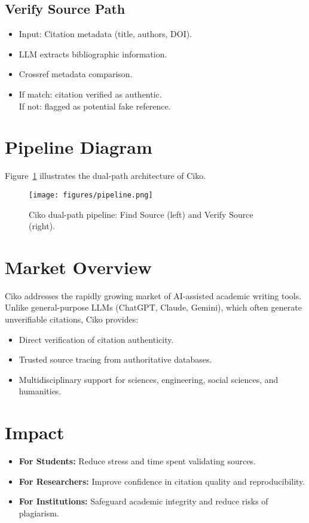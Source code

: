 \documentclass{article}
\begin{document}
\subsection{Verify Source Path}
\begin{itemize}
    \item Input: Citation metadata (title, authors, DOI).
    \item LLM extracts bibliographic information.
    \item Crossref metadata comparison.
    \item If match: citation verified as authentic. \\
          If not: flagged as potential fake reference.
\end{itemize}

\section{Pipeline Diagram}
Figure~\ref{fig:pipeline} illustrates the dual-path architecture of Ciko.

\begin{figure}[h]
    \centering
    \texttt{[image: figures/pipeline.png]}
    \caption{Ciko dual-path pipeline: Find Source (left) and Verify Source (right).}
    \label{fig:pipeline}
\end{figure}

\section{Market Overview}
Ciko addresses the rapidly growing market of AI-assisted academic writing tools. Unlike general-purpose LLMs (ChatGPT, Claude, Gemini), which often generate unverifiable citations, Ciko provides:
\begin{itemize}
    \item Direct verification of citation authenticity.
    \item Trusted source tracing from authoritative databases.
    \item Multidisciplinary support for sciences, engineering, social sciences, and humanities.
\end{itemize}

\section{Impact}
\begin{itemize}
    \item \textbf{For Students:} Reduce stress and time spent validating sources.
    \item \textbf{For Researchers:} Improve confidence in citation quality and reproducibility.
    \item \textbf{For Institutions:} Safeguard academic integrity and reduce risks of plagiarism.
\end{itemize}
\end{document}
